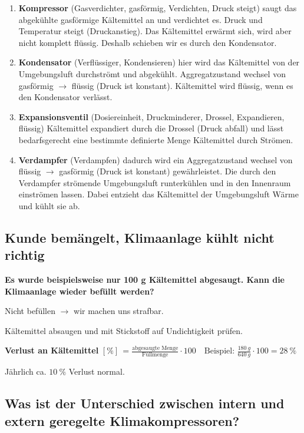 \begin{enumerate}
\item
  \textbf{Kompressor} (Gasverdichter, gasförmig, Verdichten, Druck
  steigt) saugt das abgekühlte gasförmige Kältemittel an und verdichtet
  es. Druck und Temperatur steigt (Druckanstieg). Das Kältemittel
  erwärmt sich, wird aber nicht komplett flüssig. Deshalb schieben wir
  es durch den Kondensator.
\item
  \textbf{Kondensator} (Verflüssiger, Kondensieren) hier wird das
  Kältemittel von der Umgebungsluft durchströmt und abgekühlt.
  Aggregatzustand wechsel von gasförmig $\to$ flüssig (Druck ist
  konstant). Kältemittel wird flüssig, wenn es den Kondensator verlässt.
\item
  \textbf{Expansionsventil} (Dosiereinheit, Druckminderer, Drossel,
  Expandieren, flüssig) Kältemittel expandiert durch die Drossel (Druck
  abfall) und lässt bedarfsgerecht eine bestimmte definierte Menge
  Kältemittel durch Strömen.
\item
  \textbf{Verdampfer} (Verdampfen) dadurch wird ein Aggregatzustand
  wechsel von flüssig $\to$ gasförmig (Druck ist konstant)
  gewährleistet. Die durch den Verdampfer strömende Umgebungsluft
  runterkühlen und in den Innenraum einströmen lassen. Dabei entzieht
  das Kältemittel der Umgebungsluft Wärme und kühlt sie ab.
\end{enumerate}

\newpage

\subsection{Kunde bemängelt, Klimaanlage kühlt nicht
richtig}\label{kunde-bemaengelt-klimaanlage-kuehlt-nicht-richtig}

\textbf{Es wurde beispielsweise nur 100 g Kältemittel abgesaugt. Kann
die Klimaanlage wieder befüllt werden?}

Nicht befüllen $\to$ wir machen uns strafbar.

Kältemittel absaugen und mit Stickstoff auf Undichtigkeit prüfen.

\textbf{Verlust an Kältemittel}
$[\%] \, \boxed{= \frac{\text{abgesaugte Menge}}{\text{Füllmenge}} \cdot 100} \quad \text{Beispiel: } \frac{180~g}{640~g} \cdot 100 = 28~\%$

Jährlich ca. $10~\%$ Verlust normal.

\subsection{Was ist der Unterschied zwischen intern und extern geregelte
Klimakompressoren?}\label{was-ist-der-unterschied-zwischen-intern-und-extern-geregelte-klimakompressoren}

